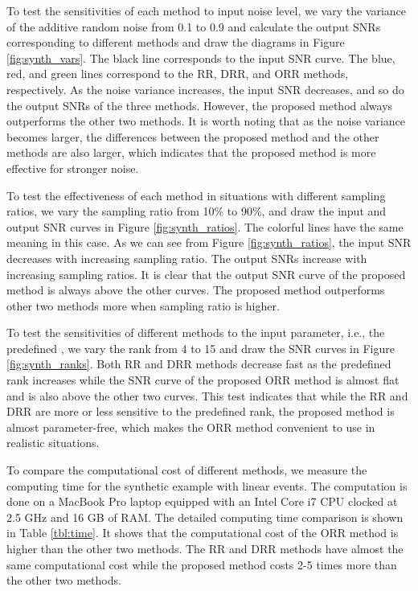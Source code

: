 To test the sensitivities of each method to input noise level, we vary the variance of the additive random noise from 0.1 to 0.9 and calculate the output SNRs corresponding to different methods and draw the diagrams in Figure \ref{fig:synth_vars}. The black line corresponds to the input SNR curve. The blue, red, and green lines correspond to the RR, DRR, and ORR methods, respectively. As the noise variance increases, the input SNR decreases, and so do the output SNRs of the three methods. However, the proposed method always outperforms the other two methods. It is worth noting that as the noise variance becomes larger, the differences between the proposed method and the other methods are also larger, which indicates that the proposed method is more effective for stronger noise.

To test the effectiveness of each method in situations with different sampling ratios, we vary the sampling ratio from 10\% to 90\%, and draw the input and output SNR curves in Figure \ref{fig:synth_ratios}. The colorful lines have the same meaning in this case. As we can see from Figure \ref{fig:synth_ratios}, the input SNR decreases with increasing sampling ratio. The output SNRs increase with increasing sampling ratios. It is clear that the output SNR curve of the proposed method is always above the other curves. The proposed method outperforms other two methods more when sampling ratio is higher. 

To test the sensitivities of different methods to the input parameter, i.e., the predefined , we vary the rank from 4 to 15 and draw the SNR curves in Figure \ref{fig:synth_ranks}. Both RR and DRR methods decrease fast as the predefined rank increases while the SNR curve of the proposed ORR method is almost flat and is also above the other two curves. This test indicates that while the RR and DRR are more or less sensitive to the predefined rank, the proposed method is almost parameter-free, which makes the ORR method convenient to use in realistic situations. 

To compare the computational cost of different methods, we measure the computing time for the synthetic example with linear events. The computation is done on a MacBook Pro laptop equipped with an Intel Core i7 CPU clocked at 2.5 GHz and 16 GB of RAM. The detailed computing time comparison is shown in Table \ref{tbl:time}. It shows that the computational cost of the ORR method is higher than the other two methods.  The RR and DRR methods have almost the same computational cost while the proposed method costs 2-5 times more than the other two methods. 

